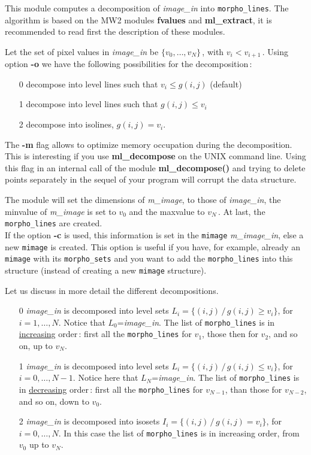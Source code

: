 This module computes a decomposition of {\em image\_in}
into {\tt morpho\_lines}. The algorithm is based on the
MW2 modules {\bf fvalues} and {\bf ml\_extract}, it is recommended
to read first the description of these modules.

\medskip

Let the set of pixel values in {\em image\_in} be 
$\{v_0,\ldots,v_N\}$\,, with $v_i<v_{i+1}$\,.
Using option {\bf -o} we have the following possibilities
for the decomposition\,:
\begin{itemize}
\item[ 0 ] decompose into level lines such that $v_i\leq g(i,j)$
  (default)
\item[ 1 ] decompose into level lines such that $g(i,j)\leq v_i$
\item[ 2 ] decompose into isolines, $g(i,j)= v_i$. 
\end{itemize}

The {\bf -m} flag allows to optimize memory occupation during
the decomposition. This is interesting if you use {\bf ml\_decompose}
on the UNIX command line. Using this flag in an internal call
of the module {\bf ml\_decompose()} and trying to delete
points separately in the sequel of your program will corrupt
the data structure.

The module will set the dimensions of {\em m\_image}, to those
of {\em image\_in}, the minvalue of {\em m\_image} is set to $v_0$ 
and the maxvalue to $v_N$\,. At last, the {\tt morpho\_lines}
are created.\\
If the option {\bf -c} is used, this information is set in the
{\tt mimage} {\em m\_image\_in}, else a new {\tt mimage} is created.
This option is useful if you have, for example, already an {\tt mimage}
with its {\tt morpho\_sets} and you want to add the {\tt morpho\_lines}
into this structure (instead of creating a new {\tt mimage} structure).

\bigskip 

Let us discuss in more detail the different decompositions.
\begin{itemize}

\item[ 0 ] {\em image\_in} is decomposed into level sets
$L_i=\{ (i,j)\,/\, g(i,j)\geq v_i\}$, for $i=1,\ldots,N$.
Notice that $L_0$={\em image\_in}. The list of {\tt morpho\_lines}
is in \underline{increasing} order\,: 
first all the {\tt morpho\_lines} for $v_1$,
those then for $v_2$, and so on, up to $v_N$.

\item[ 1 ] {\em image\_in} is decomposed into level sets
$L_i=\{ (i,j)\,/\, g(i,j)\leq v_i\}$, for $i=0,\ldots,N-1$.
Notice here that $L_N$={\em image\_in}. The list of {\tt morpho\_lines}
is in \underline{decreasing} order\,: 
first all the {\tt morpho\_lines} 
for $v_{N-1}$, than those for $v_{N-2}$, 
and so on, down to $v_0$.

\item[ 2 ] {\em image\_in} is decomposed into isosets
$I_i=\{ (i,j)\,/\, g(i,j)= v_i\}$, for $i=0,\ldots,N$.
In this case the list of {\tt morpho\_lines} is in increasing order,
from $v_0$ up to $v_N$.

\end{itemize}

